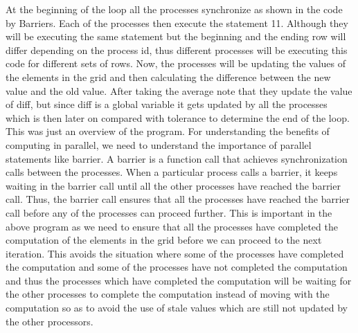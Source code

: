 \documentclass[12pt]{book}
\begin{document}
At the beginning of the loop all the processes synchronize as shown in the code by Barriers.
Each of the processes then execute the statement 11. Although they will be executing the same statement but the beginning and the ending row will differ depending 
on the process id, thus different processes will be executing this code for different sets of rows.
Now, the processes will be updating the values of the elements in the grid and then calculating the difference between the new value and the old value. After taking the average note that they 
update the value of diff, but since diff is a global variable it gets updated by all the processes which is then later on compared with tolerance to determine the end of the loop.
This was just an overview of the program. For understanding the benefits of computing in parallel, we need to understand the importance of parallel statements like barrier.
A barrier is a function call that achieves synchronization calls between the processes. When a particular process calls a barrier, it keeps waiting in the barrier call until all the other processes have reached the barrier call.
Thus, the barrier call ensures that all the processes have reached the barrier call before any of the processes can proceed further. This is important in the above program as we need to ensure that all the processes have completed the computation of the elements in the grid before we can proceed to the next iteration.
This avoids the situation where some of the processes have completed the computation and some of the processes have not completed the computation and thus the processes which have completed the computation will be waiting for the other processes to complete the computation
instead of moving with the computation so as to avoid the use of stale values which are still not updated by the other processors.
\end{document}
